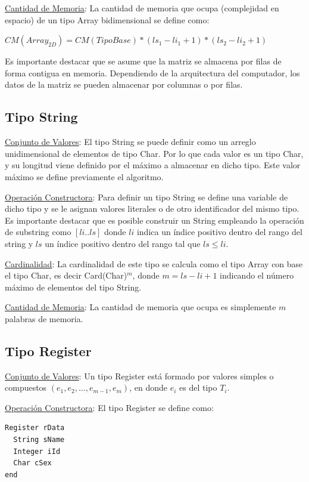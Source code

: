 \underline{Cantidad de Memoria}: La cantidad de memoria que ocupa (complejidad en espacio) de un tipo Array bidimensional se define como:

$CM(Array_{2D}) = CM(TipoBase) * (ls_1 - li_1 + 1) * (ls_2 - li_2 + 1)$

Es importante destacar que se asume que la matriz se almacena por filas de forma contigua en memoria. Dependiendo de la arquitectura del computador, los datos de la matriz se pueden almacenar por columnas o por filas.

\subsection{Tipo String}

\underline{Conjunto de Valores}: El tipo String se puede definir como un arreglo unidimensional de elementos de tipo Char. Por lo que cada valor es un tipo Char, y su longitud viene definido por el máximo a almacenar en dicho tipo. Este valor máximo se define previamente el algoritmo.

\underline{Operación Constructora}: Para definir un tipo String se define una variable de dicho tipo y se le asignan valores literales o de otro identificador del mismo tipo. Es importante destacar que es posible construir un String empleando la operación de substring como $[li..ls]$ donde $li$ indica un índice positivo dentro del rango del string y $ls$ un índice positivo dentro del rango tal que $ls \le li$.

\underline{Cardinalidad}: La cardinalidad de este tipo se calcula como el tipo Array con base el tipo Char, es decir Card(Char)$^m$, donde $m = ls - li + 1$ indicando el número máximo de elementos del tipo String.

\underline{Cantidad de Memoria}: La cantidad de memoria que ocupa es simplemente $m$ palabras de memoria.

\subsection{Tipo Register}

\underline{Conjunto de Valores}: Un tipo Register está formado por valores simples o compuestos $(e_{1}, e_{2}, ..., e_{m-1}, e_{m})$, en donde $e_i$ es del tipo $T_i$.

\underline{Operación Constructora}: El tipo Register se define como:

\begin{lstlisting}[upquote=true, language=pseudo]
Register rData
  String sName
  Integer iId
  Char cSex
end
\end{lstlisting}

